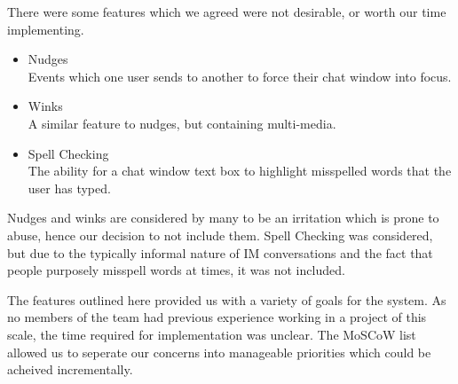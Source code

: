 There were some features which we agreed were not desirable, or worth our time implementing.

\begin{itemize}

\item{Nudges\\
	Events which one user sends to another to force their chat window into focus.}
\item{Winks\\
	A similar feature to nudges, but containing multi-media.}
\item{Spell Checking\\
	The ability for a chat window text box to highlight misspelled words that the user has typed.}

\end{itemize}

Nudges and winks are considered by many to be an irritation which is prone to abuse, hence our decision to not include them. Spell Checking was considered, but due to the typically informal nature of IM conversations and the fact that people purposely misspell words at times, it was not included.

The features outlined here provided us with a variety of goals for the system. As no members of the team had previous experience working in a project of this scale, the time required for implementation was unclear. The MoSCoW list allowed us to seperate our concerns into manageable priorities which could be acheived incrementally.
